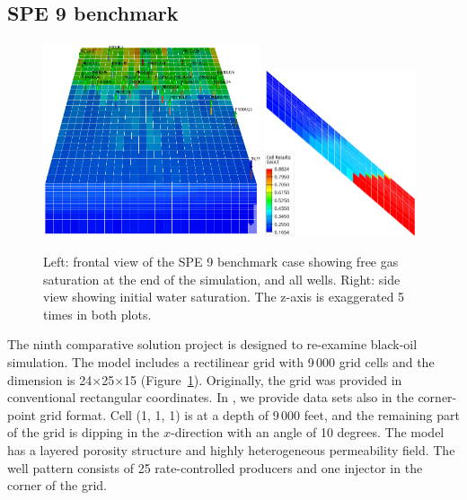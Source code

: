 \subsection{SPE 9 benchmark}
\label{sec:spe9}

\begin{figure}
  \centering
  \includegraphics[width=0.57\textwidth]{figures/spe9/spe9_sgas}
  \includegraphics[width=0.4\textwidth]{figures/spe9/spe9_swat_initial}
  \caption{Left: frontal view of the SPE 9 benchmark case showing free
    gas saturation at the end of the simulation, and all wells. Right:
    side view showing initial water
    saturation. The z-axis is exaggerated 5 times in both plots.}
  \label{fig:spe9_sgas_swat}
\end{figure}


The ninth comparative solution project \citep{killough1995ninth} is designed to re-examine
black-oil simulation. The model includes a rectilinear grid with 9\,000 grid cells
and the dimension is 24$\times$25$\times$15 (Figure~\ref{fig:spe9_sgas_swat}).
Originally, the grid was provided in conventional rectangular
coordinates. In \opmdata, we provide data sets also in the corner-point grid format.
Cell (1, 1, 1) is at a depth of 9\,000 feet, and the remaining part of the grid is dipping in the
$x$-direction with an angle of 10 degrees. The model has a layered porosity
structure and highly heterogeneous permeability field. The well pattern
consists of 25 rate-controlled producers and one injector in the corner of the grid.

